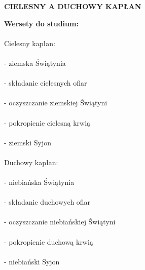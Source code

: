 \documentclass[10pt,a4paper,oneside]{article}
\begin{document}
\centerline{\textbf{\MakeUppercase{Cielesny a duchowy kapłan}}}
\begin{center}
\textbf{Wersety do studium:} 

\end{center}
\paragraph{}
Cielesny kapłan:
\paragraph{}
- ziemska Świątynia
\paragraph{}
- składanie cielesnych ofiar
\paragraph{}
- oczyszczanie ziemskiej Świątyni
\paragraph{}
- pokropienie cielesną krwią
\paragraph{}
- ziemski Syjon
\paragraph{}
Duchowy kapłan:
\paragraph{}
- niebiańska Świątynia
\paragraph{}
- składanie duchowych ofiar
\paragraph{}
- oczyszczanie niebiańskiej Świątyni
\paragraph{}
- pokropienie duchową krwią
\paragraph{}
- niebiański Syjon
\end{document}
